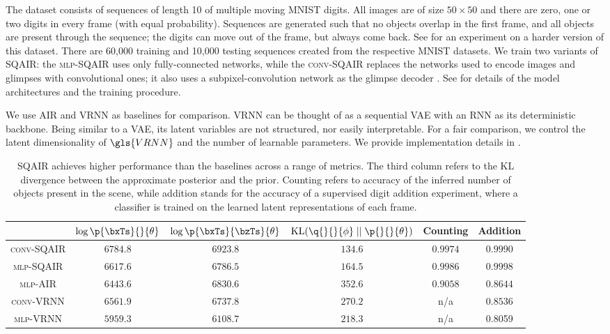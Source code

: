 The dataset consists of sequences of length 10 of multiple moving \gls{MNIST} digits. All images are of size $50 \times 50$ and there are zero, one or two digits in every frame (with equal probability).
Sequences are generated such that no objects overlap in the first frame, and all objects are present through the sequence; the digits can move out of the frame, but always come back.
See  for an experiment on a harder version of this dataset.
There are 60,000 training and 10,000 testing sequences created from the respective \gls{MNIST} datasets.
We train two variants of \gls{SQAIR}: the \textsc{mlp}-\gls{SQAIR} uses only fully-connected networks, while the \textsc{conv}-\gls{SQAIR} replaces the networks used to encode images and glimpses with convolutional ones; it also uses a subpixel-convolution network as the glimpse decoder \citep{Shi2016subpixel}.
See  for details of the model architectures and the training procedure.

We use \gls{AIR} and \gls{VRNN} \citep{Chung2015} as baselines for comparison.  \gls{VRNN} can be thought of as a sequential \gls{VAE} with an \gls{RNN} as its deterministic backbone. Being similar to a \gls{VAE}, its latent variables are not structured, nor easily interpretable. For a fair comparison, we control the latent dimensionality of $\gls{VRNN}$ and the number of learnable parameters. We provide implementation details in .

\begin{table}
    \centering
    \begin{tabular}{c|c|c|c|c|c}
                         & $\log \p{\bxTs}{}{\theta}$ & $\log \p{\bxTs}{\bzTs}{\theta}$  & $\kl{\q{}{}{\phi}}{\p{}{}{\theta}}$ & Counting & Addition\\
                         \hline
        \textsc{conv}-\gls{SQAIR} & $\bm{6784.8}$ & $\bm{6923.8}$ & $\bm{134.6}$ & $0.9974$ & $0.9990$ \\
        \textsc{mlp}-\gls{SQAIR}  & $6617.6$      & $6786.5$      & $164.5$      & $\mathbf{0.9986}$ & $\mathbf{0.9998}$ \\
        \textsc{mlp}-\gls{AIR}    & $6443.6$      & $6830.6$      & $352.6$      & $0.9058$ & $0.8644$\\
        \textsc{conv}-\gls{VRNN}  & $6561.9$      & $6737.8$      & $270.2$      & n/a & $0.8536$\\
        \textsc{mlp}-\gls{VRNN}   & $5959.3$      & $6108.7$      & $218.3$      & n/a  & 0.8059 \\
    \end{tabular}
    \vspace{5pt}
    \caption{\gls{SQAIR} achieves higher performance than the baselines across a range of metrics. The third column refers to the \gls{KL} divergence between the approximate posterior and the prior. Counting refers to accuracy of the inferred number of objects present in the scene, while addition stands for the accuracy of a supervised digit addition experiment, where a classifier is trained on the learned latent representations of each frame.}
    \label{tab:quant}
\end{table}

